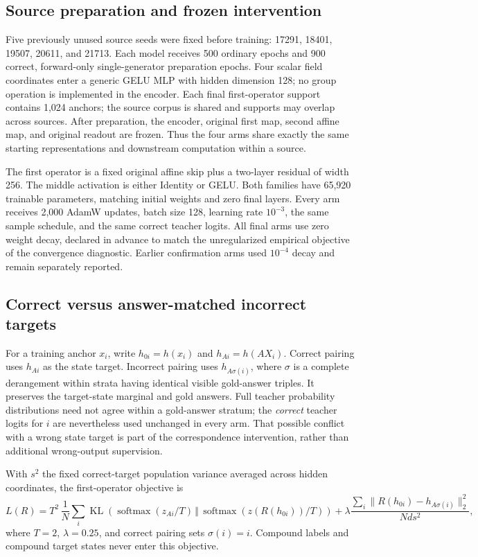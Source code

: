 \subsection{Source preparation and frozen intervention}
Five previously unused source seeds were fixed before training:
17291, 18401, 19507, 20611, and 21713.
Each model receives 500 ordinary epochs and 900 correct, forward-only single-generator preparation epochs. Four scalar field coordinates enter a generic GELU MLP with hidden dimension 128; no group operation is implemented in the encoder. Each final first-operator support contains 1,024 anchors; the source corpus is shared and supports may overlap across sources.
After preparation, the encoder, original first map, second affine map, and original readout are frozen.
Thus the four arms share exactly the same starting representations and downstream computation within a source.

The first operator is a fixed original affine skip plus a two-layer residual of width 256. The middle activation is either Identity or GELU. Both families have 65,920 trainable parameters, matching initial weights and zero final layers. Every arm receives 2,000 AdamW updates, batch size 128, learning rate $10^{-3}$, the same sample schedule, and the same correct teacher logits. All final arms use zero weight decay, declared in advance to match the unregularized empirical objective of the convergence diagnostic. Earlier confirmation arms used $10^{-4}$ decay and remain separately reported.

\subsection{Correct versus answer-matched incorrect targets}
For a training anchor $x_i$, write $h_{0i}=h(x_i)$ and $h_{Ai}=h(AX_i)$.
Correct pairing uses $h_{Ai}$ as the state target. Incorrect pairing uses
$h_{A\sigma(i)}$, where $\sigma$ is a complete derangement within strata having identical visible gold-answer triples. It preserves the target-state marginal and gold answers. Full teacher probability distributions need not agree within a gold-answer stratum; the \emph{correct} teacher logits for $i$ are nevertheless used unchanged in every arm. That possible conflict with a wrong state target is part of the correspondence intervention, rather than additional wrong-output supervision.

With $s^2$ the fixed correct-target population variance averaged across hidden coordinates, the first-operator objective is
\begin{equation}
 L(R)=T^2\,\frac1N\sum_i
 \operatorname{KL}\!\left(
 \operatorname{softmax}(z_{Ai}/T)\,\Vert\,
 \operatorname{softmax}(z(R(h_{0i}))/T)
 \right)
 +\lambda\frac{\sum_i\|R(h_{0i})-h_{A\sigma(i)}\|_2^2}{Nds^2},
\label{eq:loss}
\end{equation}
where $T=2$, $\lambda=0.25$, and correct pairing sets $\sigma(i)=i$.
Compound labels and compound target states never enter this objective.

